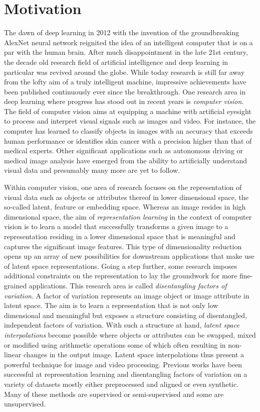 \documentclass[12pt,a4paper]{article}
\begin{document}
\section{Motivation}
The dawn of deep learning in 2012 with the invention of the groundbreaking AlexNet neural network reignited the idea of an intelligent computer that is on a par with the human brain. After much disappointment in the late 21st century, the decade old research field of artificial intelligence and deep learning in particular was revived around the globe. While today research is still far away from the lofty aim of a truly intelligent machine, impressive achievements have been published continuously ever since the breakthrough. One research area in deep learning where progress has stood out in recent years is \textit{computer vision}. The field of computer vision aims at equipping a machine with artificial eyesight to process and interpret visual signals such as images and video. For instance, the computer has learned to classify objects in images with an accuracy that exceeds human performance or identifies skin cancer with a precision higher than that of medical experts. Other significant applications such as autonomous driving or medical image analysis have emerged from the ability to artificially understand visual data and presumably many more are yet to follow. 

Within computer vision, one area of research focuses on the representation of visual data such as objects or attributes thereof in lower dimensional space, the so-called latent, feature or embedding space. Whereas an image resides in high dimensional space, the aim of \textit{representation learning} in the context of computer vision is to learn a model that successfully transforms a given image to a representation residing in a lower dimensional space that is meaningful and captures the significant image features. This type of dimensionality reduction opens up an array of new possibilities for downstream applications that make use of latent space representations. Going a step further, some research imposes additional constraints on the representation to lay the groundwork for more fine-grained applications. This research area is called \textit{disentangling factors of variation}. A factor of variation represents an image object or image attribute in latent space. The aim is to learn a representation that is not only low dimensional and meaningful but exposes a structure consisting of disentangled, independent factors of variation. With such a structure at hand, \textit{latent space interpolations} become possible where objects or attributes can be swapped, mixed or modified using arithmetic operations some of which often resulting in non-linear changes in the output image. Latent space interpolations thus present a powerful technique for image and video processing. Previous works have been successful at representation learning and disentangling factors of variation on a variety of datasets mostly either preprocessed and aligned or even synthetic. Many of these methods are supervised or semi-supervised and some are unsupervised.
\end{document}

